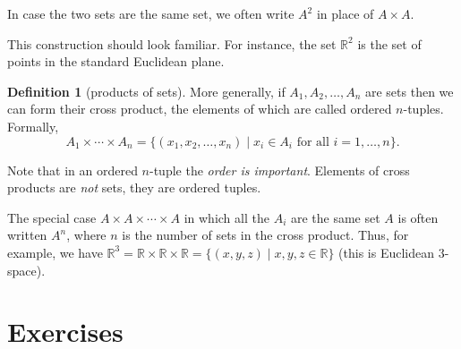 \documentclass[11pt]{article}
\theoremstyle{definition}
\newtheorem{defn}[thm]{Definition}
\newcommand{\R}{\mathbb{R}} %
\begin{document}
In case the two sets are the same set, we often write $A^2$ in place
of $A \times A$.

This construction should look familiar. For instance, the set $\R^2$
is the set of points in the standard Euclidean plane.

\begin{defn}[products of sets]
More generally, if $A_1, A_2, \dots, A_n$ are sets then we can form
their cross product, the elements of which are called ordered
$n$-tuples. Formally,
$$
A_1 \times \cdots \times A_n = \{ (x_1, x_2, \dots, x_n) \mid x_i \in
A_i \text{ for all }  i = 1, \dots, n\}.
$$
\end{defn}

Note that in an ordered $n$-tuple the {\em order is
  important}. Elements of cross products are \emph{not} sets, they are
ordered tuples. 

The special case $A \times A \times \cdots \times A$ in which all the
$A_i$ are the same set $A$ is often written $A^n$, where $n$ is the
number of sets in the cross product. Thus, for example, we have $\R^3
= \R \times \R \times \R = \{ (x,y,z) \mid x,y,z \in \R \}$ (this is
Euclidean $3$-space).


\section*{Exercises}
\end{document}
